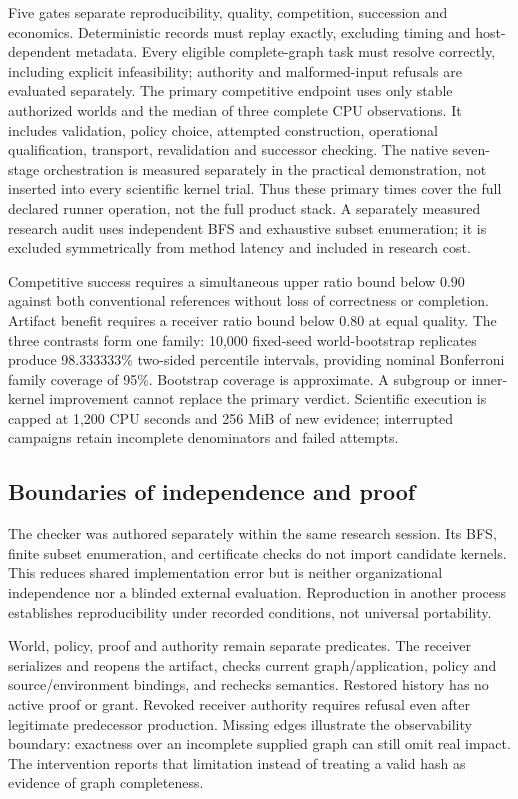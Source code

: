 \documentclass[11pt,letterpaper]{article}
\begin{document}
Five gates separate reproducibility, quality, competition, succession and economics. Deterministic records must replay exactly, excluding timing and host-dependent metadata. Every eligible complete-graph task must resolve correctly, including explicit infeasibility; authority and malformed-input refusals are evaluated separately. The primary competitive endpoint uses only stable authorized worlds and the median of three complete CPU observations. It includes validation, policy choice, attempted construction, operational qualification, transport, revalidation and successor checking. The native seven-stage orchestration is measured separately in the practical demonstration, not inserted into every scientific kernel trial. Thus these primary times cover the full declared runner operation, not the full product stack. A separately measured research audit uses independent BFS and exhaustive subset enumeration; it is excluded symmetrically from method latency and included in research cost.

Competitive success requires a simultaneous upper ratio bound below $0.90$ against both conventional references without loss of correctness or completion. Artifact benefit requires a receiver ratio bound below $0.80$ at equal quality. The three contrasts form one family: 10,000 fixed-seed world-bootstrap replicates~\cite{efron1979bootstrap} produce 98.333333\% two-sided percentile intervals, providing nominal Bonferroni family coverage of 95\%. Bootstrap coverage is approximate. A subgroup or inner-kernel improvement cannot replace the primary verdict. Scientific execution is capped at 1,200 CPU seconds and 256 MiB of new evidence; interrupted campaigns retain incomplete denominators and failed attempts.

\subsection{Boundaries of independence and proof}

The checker was authored separately within the same research session. Its BFS, finite subset enumeration, and certificate checks do not import candidate kernels. This reduces shared implementation error but is neither organizational independence nor a blinded external evaluation. Reproduction in another process establishes reproducibility under recorded conditions, not universal portability.

World, policy, proof and authority remain separate predicates. The receiver serializes and reopens the artifact, checks current graph/application, policy and source/environment bindings, and rechecks semantics. Restored history has no active proof or grant. Revoked receiver authority requires refusal even after legitimate predecessor production. Missing edges illustrate the observability boundary: exactness over an incomplete supplied graph can still omit real impact. The intervention reports that limitation instead of treating a valid hash as evidence of graph completeness.
\end{document}
